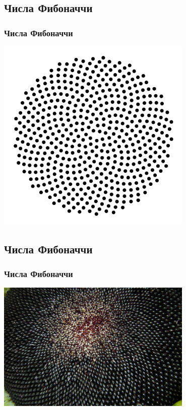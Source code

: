 \documentclass[compress,red]{beamer}
\begin{document}
\subsection{Числа Фибоначчи}
\begin{frame}
  \frametitle{Числа Фибоначчи}
	\centerline{\includegraphics[width=0.7\textwidth]{images/sunflower1.png}}
\end{frame}

\subsection{Числа Фибоначчи}
\begin{frame}
  \frametitle{Числа Фибоначчи}
	\centerline{\includegraphics[width=0.7\textwidth]{images/sunflower2.png}}
\end{frame}
\end{document}
